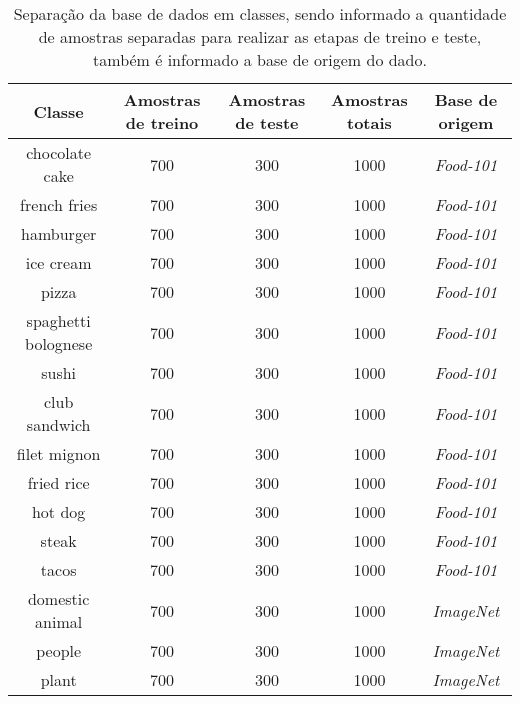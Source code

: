 \begin{table}[H]
    \centering
    \caption[Disposição da base de dados]{Separação da base de dados em classes, sendo informado a quantidade de amostras separadas para realizar as etapas de treino e teste, também é informado a base de origem do dado.
    \label{tab:base_images}}
    \begin{tabular}{ccccc}
        \toprule
             Classe & Amostras de treino & Amostras de teste & Amostras totais & Base de origem \\
        \midrule
            chocolate cake & 700 & 300 & 1000 & \textit{Food-101}\\
            french fries & 700 & 300 & 1000 & \textit{Food-101}\\
            hamburger & 700 & 300 & 1000 & \textit{Food-101}\\
            ice cream & 700 & 300 & 1000 & \textit{Food-101}\\
            pizza & 700 & 300 & 1000 & \textit{Food-101}\\
            spaghetti bolognese & 700 & 300 & 1000 & \textit{Food-101}\\
            sushi & 700 & 300 & 1000 & \textit{Food-101}\\
            club sandwich & 700 & 300 & 1000 & \textit{Food-101}\\
            filet mignon & 700 & 300 & 1000 & \textit{Food-101}\\
            fried rice & 700 & 300 & 1000 & \textit{Food-101}\\
            hot dog & 700 & 300 & 1000 & \textit{Food-101}\\
            steak & 700 & 300 & 1000 & \textit{Food-101}\\
            tacos & 700 & 300 & 1000 & \textit{Food-101}\\
            domestic animal & 700 & 300 & 1000 & \textit{ImageNet}\\
            people & 700 & 300 & 1000 & \textit{ImageNet}\\
            plant & 700 & 300 & 1000 & \textit{ImageNet}\\

        \bottomrule
    \end{tabular}
\end{table}
